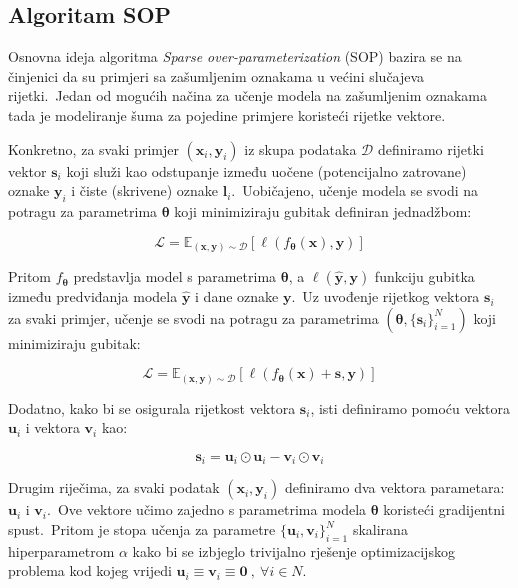 \documentclass[diplomskirad]{fer}
\begin{document}
\subsection{Algoritam SOP}
\label{sub:sop}

Osnovna ideja algoritma \textit{Sparse over-parameterization} (SOP) bazira se na činjenici da su primjeri sa zašumljenim oznakama u većini slučajeva rijetki.\ 
Jedan od mogućih načina za učenje modela na zašumljenim oznakama tada je modeliranje šuma za pojedine primjere koristeći rijetke vektore.\ 

Konkretno, za svaki primjer $(\bm{x}_i, \bm{y}_i)$ iz skupa podataka $\mathcal{D}$ definiramo rijetki vektor $\bm{s}_i$ koji služi kao odstupanje između uočene (potencijalno zatrovane) oznake $\bm{y}_i$ i čiste (skrivene) oznake $\bm{l}_i$.\ 
Uobičajeno, učenje modela se svodi na potragu za parametrima $\bm{\theta}$ koji minimiziraju gubitak definiran jednadžbom:

\begin{equation}
  \mathcal{L} = \mathbb{E}_{(\bm{x}, \bm{y}) \sim \mathcal{D}} \left[ \ell(f_{\bm{\theta}}(\bm{x}), \bm{y}) \right]
  \label{eq:sop1}
\end{equation}

Pritom $f_{\bm{\theta}}$ predstavlja model s parametrima $\bm{\theta}$, a $\ell(\bm{\hat{y}}, \bm{y})$ funkciju gubitka između predviđanja modela $\bm{\hat{y}}$ i dane oznake $\bm{y}$.\ 
Uz uvođenje rijetkog vektora $\bm{s}_i$ za svaki primjer, učenje se svodi na potragu za parametrima $(\bm{\theta}, \{\bm{s}_i\}_{i=1}^N)$ koji minimiziraju gubitak:

\begin{equation}
  \mathcal{L} = \mathbb{E}_{(\bm{x}, \bm{y}) \sim \mathcal{D}} \left[ \ell(f_{\bm{\theta}}(\bm{x}) + \bm{s}, \bm{y}) \right]
  \label{eq:sop2}
\end{equation}

Dodatno, kako bi se osigurala rijetkost vektora $\bm{s}_i$, isti definiramo pomoću vektora $\bm{u}_i$ i vektora $\bm{v}_i$ kao:

\begin{equation}
  \bm{s}_i = \bm{u}_i \odot \bm{u}_i - \bm{v}_i \odot \bm{v}_i
  \label{eq:sop_s1}
\end{equation}

Drugim riječima, za svaki podatak $(\bm{x}_i, \bm{y}_i)$ definiramo dva vektora parametara: $\bm{u}_i$ i $\bm{v}_i$.\ 
Ove vektore učimo zajedno s parametrima modela $\bm{\theta}$ koristeći gradijentni spust.\ 
Pritom je stopa učenja za parametre $\{\bm{u}_i,\bm{v}_i\}_{i=1}^N$ skalirana hiperparametrom $\alpha$ kako bi se izbjeglo trivijalno rješenje optimizacijskog problema kod kojeg vrijedi $\bm{u}_i \equiv \bm{v}_i \equiv \bm{0}\:,\:\forall i \in N$.\ 
\end{document}
